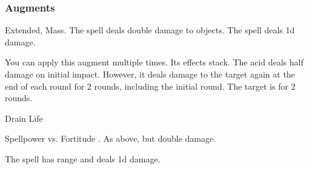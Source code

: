 \subsubsection{Augments}
 Extended, Mass.
The spell deals double damage to objects.
The spell deals \plus1d damage.
\par
You can apply this augment multiple times.
Its effects stack.
The acid deals half damage on initial impact.
However, it deals damage to the target again at the end of each round for 2 rounds, including the initial round.
The target is  for 2 rounds.
\begin{spellsection}{Drain Life}
\begin{spellcontent}
\begin{spelltargetinginfo}
\end{spelltargetinginfo}
\begin{spelleffects}
\begin{spellattack}{Spellpower vs. Fortitude}
\spellsuccess {}.
\spellcritical As above, but double damage.
\end{spellattack}
\end{spelleffects}
\end{spellcontent}
\begin{spellfooter}
\miscastexplode
\end{spellfooter}
\begin{spellcantrip}
The spell has \rngclose range and deals \minus1d damage.
\end{spellcantrip}
\end{spellsection}
